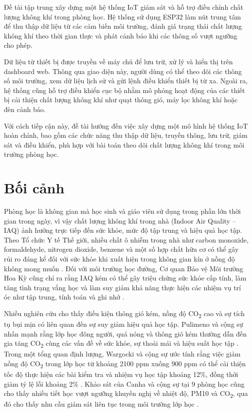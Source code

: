 Đề tài tập trung xây dựng một hệ thống IoT giám sát và hỗ trợ điều chỉnh chất lượng không khí trong phòng học. Hệ thống sử dụng ESP32 làm nút trung tâm để thu thập dữ liệu từ các cảm biến môi trường, đánh giá trạng thái chất lượng không khí theo thời gian thực và phát cảnh báo khi các thông số vượt ngưỡng cho phép.

Dữ liệu từ thiết bị được truyền về máy chủ để lưu trữ, xử lý và hiển thị trên dashboard web. Thông qua giao diện này, người dùng có thể theo dõi các thông số môi trường, xem dữ liệu lịch sử và gửi lệnh điều khiển thiết bị từ xa. Ngoài ra, hệ thống cũng hỗ trợ điều khiển cục bộ nhằm mô phỏng hoạt động của các thiết bị cải thiện chất lượng không khí như quạt thông gió, máy lọc không khí hoặc đèn cảnh báo.

Với cách tiếp cận này, đề tài hướng đến việc xây dựng một mô hình hệ thống IoT hoàn chỉnh, bao gồm các chức năng thu thập dữ liệu, truyền thông, lưu trữ, giám sát và điều khiển, phù hợp với bài toán theo dõi chất lượng không khí trong môi trường phòng học.
\section{Bối cảnh}

Phòng học là không gian mà học sinh và giáo viên sử dụng trong phần lớn thời gian trong
ngày, vì vậy chất lượng không khí trong nhà (Indoor Air Quality -- IAQ) ảnh hưởng trực
tiếp đến sức khỏe, mức độ tập trung và hiệu quả học tập. Theo Tổ chức Y tế Thế giới,
nhiều chất ô nhiễm trong nhà như carbon monoxide, formaldehyde, nitrogen dioxide,
benzene và một số hợp chất hữu cơ có thể gây rủi ro đáng kể đối với sức khỏe khi xuất
hiện trong không gian kín ở nồng độ không mong muốn \cite{whoiaq}. Đối với môi trường
học đường, Cơ quan Bảo vệ Môi trường Hoa Kỳ cũng chỉ ra rằng IAQ kém có thể gây triệu
chứng sức khỏe cấp tính, làm tăng tình trạng vắng học và làm suy giảm khả năng thực
hiện các nhiệm vụ trí óc như tập trung, tính toán và ghi nhớ \cite{epaiaqstudent}.

Nhiều nghiên cứu cho thấy điều kiện thông gió kém, nồng độ CO\textsubscript{2} cao và sự
tích tụ bụi mịn có liên quan đến sự suy giảm hiệu quả học tập. Pulimeno và cộng sự nhấn
mạnh rằng lớp học đông người, quá nóng và thông gió kém thường dẫn đến gia tăng
CO\textsubscript{2} cùng các vấn đề về sức khỏe, sự thoải mái và hiệu suất học tập
\cite{pulimeno2020}. Trong một tổng quan định lượng, Wargocki và cộng sự ước tính rằng
việc giảm nồng độ CO\textsubscript{2} trong lớp học từ khoảng 2100 ppm xuống 900 ppm có
thể cải thiện tốc độ thực hiện các bài kiểm tra và nhiệm vụ học tập khoảng 12\%, đồng
thời giảm tỷ lệ lỗi khoảng 2\% \cite{wargocki2020}. Khảo sát của Canha và cộng sự tại
9 phòng học cũng cho thấy nhiều tiết học vượt ngưỡng khuyến nghị về nhiệt độ, PM10 và
CO\textsubscript{2}, qua đó cho thấy nhu cầu giám sát liên tục trong môi trường lớp học
\cite{canha2024}.

